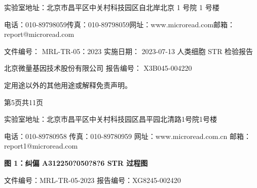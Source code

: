 \documentclass[UTF8,10pt,a4paper,fontset=fandol]{ctexart}
\newcommand{\fieldvalue}[1]{#1}
\begin{document}
\bigskip

\noindent
实验室地址：北京市昌平区中关村科技园区自北岸北京 1 号院 1 号楼

\noindent
电话：010-89798059\quad 传真：010-89798059\quad 网址：www.microread.com\quad 邮箱：report@microread.com

\newpage

\noindent
\begin{flushleft}
\small
文件编号：
\fieldvalue{MRL-TR-05：2023}
\hfill
实施日期：
\fieldvalue{2023-07-13}
\hfill
人类细胞 STR 检验报告

北京微量基因技术股份有限公司
\hfill
报告编号：
\fieldvalue{X3B045-004220}
\end{flushleft}

\noindent
定用途以外的其他用途或解释免责声明。

\vfill

\begin{center}
\small
第5页共11页

实验室地址：北京市昌平区中关村科技园区昌平园北清路1号院1号楼

电话：010-89780958 \quad 传真：010-89780959 \quad
网址：www.microread.com.cn \quad 邮箱：report1@microread.com
\end{center}

\newpage

\begin{center}
\textbf{图 1：纠偏 A312250?050?8?6 STR 过程图}
\end{center}

\begin{center}
\end{center}

\vfill

\noindent
文件编号：MRL-TR-05-2023 \qquad 报告编号：XG8245-002420

\noindent
\end{document}
